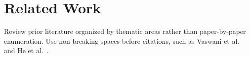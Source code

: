 \section{Related Work}
\label{sec:related_work}

Review prior literature organized by thematic areas rather than paper-by-paper enumeration. Use non-breaking spaces before citations, such as Vaswani et al.~\cite{vaswani2017attention} and He et al.~\cite{he2016deep}.
